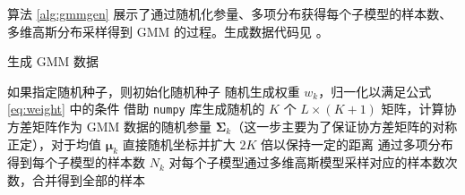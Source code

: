     算法 \ref{alg:gmmgen} 展示了通过随机化参量、多项分布获得每个子模型的样本数、多维高斯分布采样得到 GMM 的过程\cite{gmmgen}。生成数据代码见 。

    \begin{algorithm}
        \caption{生成 GMM 数据}\label{alg:gmmgen}
        如果指定随机种子，则初始化随机种子\;
        随机生成权重 $w_k$，归一化以满足公式 \eqref{eq:weight} 中的条件\;
        借助 \verb"numpy" 库生成随机的 $K$ 个 $L\times (K+1)$ 矩阵，计算协方差矩阵作为 GMM 数据的随机参量 $\bm{\Sigma}_k$（这一步主要为了保证协方差矩阵的对称正定\cite{multinorm}），对于均值 $\bm{\mu}_k$ 直接随机坐标并扩大 $2K$ 倍以保持一定的距离\;
        通过多项分布得到每个子模型的样本数 $N_k$\;
        对每个子模型通过多维高斯模型采样对应的样本数次数，合并得到全部的样本\;
    \end{algorithm}
    

    
